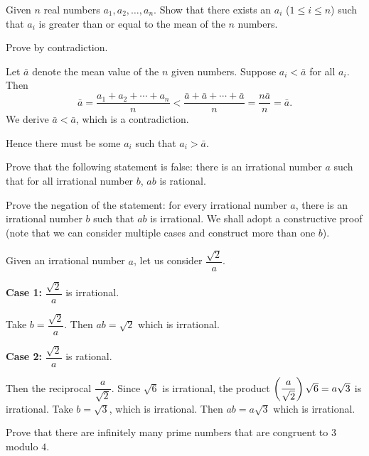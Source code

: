 \begin{exercise}
Given $n$ real numbers $a_1,a_2,\dots,a_n$. Show that there exists an $a_i$ ($1\le i\le n$) such that $a_i$ is greater than or equal to the mean of the $n$ numbers.
\end{exercise}

\begin{solution}
Prove by contradiction.

Let $\bar{a}$ denote the mean value of the $n$ given numbers. Suppose $a_i<\bar{a}$ for all $a_i$. Then
\[ \bar{a}=\frac{a_1+a_2+\cdots+a_n}{n}<\frac{\bar{a}+\bar{a}+\cdots+\bar{a}}{n}=\frac{n\bar{a}}{n}=\bar{a}. \]
We derive $\bar{a}<\bar{a}$, which is a contradiction.

Hence there must be some $a_i$ such that $a_i>\bar{a}$.
\end{solution}

\begin{exercise}
Prove that the following statement is false: there is an irrational number $a$ such that for all irrational number $b$, $ab$ is rational.
\end{exercise}

\begin{idea}
Prove the negation of the statement: for every irrational number $a$, there is an irrational number $b$ such that $ab$ is irrational. We shall adopt a constructive proof (note that we can consider multiple cases and construct more than one $b$).
\end{idea}

\begin{solution}
Given an irrational number $a$, let us consider $\dfrac{\sqrt{2}}{a}$.

\textbf{Case 1:} $\dfrac{\sqrt{2}}{a}$ is irrational.

Take $b=\dfrac{\sqrt{2}}{a}$. Then $ab=\sqrt{2}$ which is irrational.

\textbf{Case 2:} $\dfrac{\sqrt{2}}{a}$ is rational.

Then the reciprocal $\dfrac{a}{\sqrt{2}}$. Since $\sqrt{6}$ is irrational, the product $\left(\dfrac{a}{\sqrt{2}}\right)\sqrt{6}=a\sqrt{3}$ is irrational. Take $b=\sqrt{3}$, which is irrational. Then $ab=a\sqrt{3}$ which is irrational.
\end{solution}

\begin{exercise}
Prove that there are infinitely many prime numbers that are congruent to $3$ modulo $4$.
\end{exercise}

